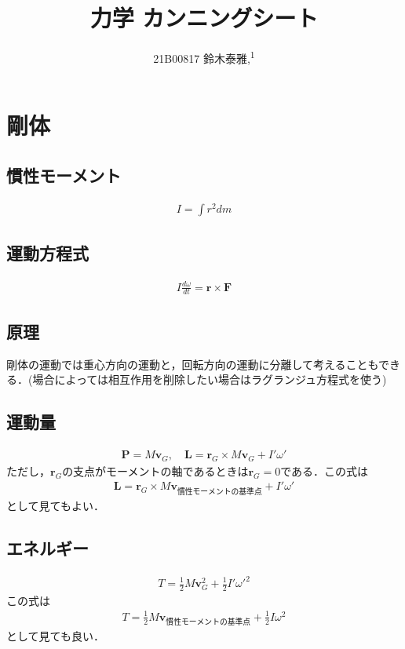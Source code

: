 \documentclass[12pt,dvipdfmx]{jsarticle}
\newcommand\authormark[1]{\textsuperscript{#1}}
\begin{document}
\title{力学 カンニングシート}

\author{21B00817 鈴木泰雅,\authormark{1}}
\section*{\Large{剛体}}
\subsection*{慣性モーメント}
\begin{eqnarray}
  I = \int r^2 dm
\end{eqnarray}
\subsection*{運動方程式}
\begin{eqnarray}
  I\frac{d\omega}{dt} = \bm{r}\times\bm{F}
\end{eqnarray}
\subsection*{原理}
剛体の運動では重心方向の運動と，回転方向の運動に分離して考えることもできる．(場合によっては相互作用を削除したい場合はラグランジュ方程式を使う)
\subsection*{運動量}
\begin{eqnarray}
  \bm{P}= M\bm{v}_G, \quad \bm{L}= \bm{r}_G \times M\bm{v}_G + I'\omega'
\end{eqnarray}
ただし，$\bm{r}_G$の支点がモーメントの軸であるときは$\bm{r}_G=0$である．この式は
\begin{eqnarray}
  \bm{L}= \bm{r}_{G} \times M\bm{v}_{慣性モーメントの基準点} + I'\omega'
\end{eqnarray}
として見てもよい．

\subsection*{エネルギー}
\begin{eqnarray}
  T = \frac{1}{2}M\bm{v}_G^2 + \frac{1}{2}I'\omega'^2
\end{eqnarray}
この式は
\begin{eqnarray}
  T = \frac{1}{2}M\bm{v}_{慣性モーメントの基準点} + \frac{1}{2}I\omega^2
\end{eqnarray}
として見ても良い．
\end{document}
